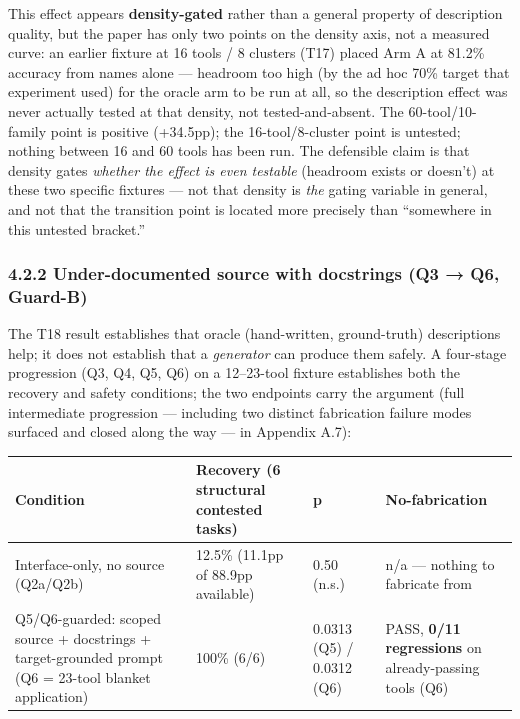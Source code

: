 This effect appears \textbf{density-gated} rather than a general
property of description quality, but the paper has only two points on
the density axis, not a measured curve: an earlier fixture at 16 tools /
8 clusters (T17) placed Arm A at 81.2\% accuracy from names alone ---
headroom too high (by the ad hoc 70\% target that experiment used) for
the oracle arm to be run at all, so the description effect was never
actually tested at that density, not tested-and-absent. The
60-tool/10-family point is positive (+34.5pp); the 16-tool/8-cluster
point is untested; nothing between 16 and 60 tools has been run. The
defensible claim is that density gates \emph{whether the effect is even
testable} (headroom exists or doesn't) at these two specific fixtures
--- not that density is \emph{the} gating variable in general, and not
that the transition point is located more precisely than ``somewhere in
this untested bracket.''

\hypertarget{under-documented-source-with-docstrings-q3-q6-guard-b}{%
\subsubsection{4.2.2 Under-documented source with docstrings (Q3 → Q6,
Guard-B)}\label{under-documented-source-with-docstrings-q3-q6-guard-b}}

The T18 result establishes that oracle (hand-written, ground-truth)
descriptions help; it does not establish that a \emph{generator} can
produce them safely. A four-stage progression (Q3, Q4, Q5, Q6) on a
12--23-tool fixture establishes both the recovery and safety conditions;
the two endpoints carry the argument (full intermediate progression ---
including two distinct fabrication failure modes surfaced and closed
along the way --- in Appendix A.7):

\renewcommand{\arraystretch}{1.15}
\begin{longtable}{@{}p{}p{}p{}p{}@{}}
\toprule
\textbf{Condition} & \textbf{Recovery (6 structural contested tasks)} & \textbf{p} &
\textbf{No-fabrication} \\
\midrule
\endhead
Interface-only, no source (Q2a/Q2b) & 12.5\% (11.1pp of 88.9pp
available) & 0.50 (n.s.) & n/a --- nothing to fabricate from \\
Q5/Q6-guarded: scoped source + docstrings + target-grounded prompt (Q6 =
23-tool blanket application) & 100\% (6/6) & 0.0313 (Q5) / 0.0312 (Q6) &
PASS, \textbf{0/11 regressions} on already-passing tools (Q6) \\
\bottomrule
\end{longtable}
\renewcommand{\arraystretch}{1}

